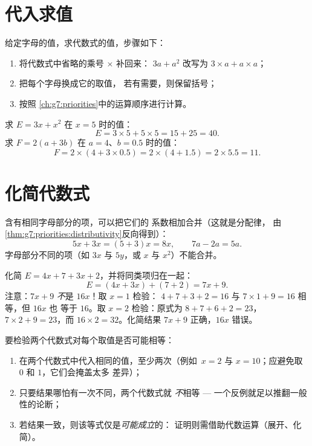 \section{代入求值}

\begin{method}[代数式求值]\label{met:g7:literal:substitute}
给定字母的值，求代数式的值，步骤如下：
\begin{enumerate}
  \item 将代数式中省略的乘号 $\times$ 补回来：
        $3a + a^2$ 改写为 $3 \times a + a \times a$；
  \item 把每个字母换成它的取值，
        若有需要，则保留括号；
  \item 按照
        \cref{ch:g7:priorities}中的运算顺序进行计算。
\end{enumerate}
\end{method}

\begin{example}\label{ex:g7:literal:substitute}
求 $E = 3x + x^2$ 在 $x = 5$ 时的值：
\[
E = 3 \times 5 + 5 \times 5 = 15 + 25 = 40 .
\]
求 $F = 2(a + 3b)$ 在 $a = 4$、$b = 0.5$ 时的值：
\[
F = 2 \times (4 + 3 \times 0.5) = 2 \times (4 + 1.5) = 2 \times 5.5
= 11 .
\]
\end{example}

\section{化简代数式}

\begin{proposition}[合并同类项]\label{prop:g7:literal:reduce}
含有相同字母部分的项，可以把它们的
系数相加合并（这就是分配律，
由\cref{thm:g7:priorities:distributivity}反向得到）：
\[
5x + 3x = (5 + 3)x = 8x,
\qquad
7a - 2a = 5a .
\]
字母部分不同的项（如 $3x$ 与 $5y$，或 $x$ 与
$x^2$）不能合并。
\end{proposition}

\begin{example}\label{ex:g7:literal:reduce}
化简 $E = 4x + 7 + 3x + 2$，并将同类项归在一起：
\[
E = (4x + 3x) + (7 + 2) = 7x + 9 .
\]
注意：$7x + 9$ \emph{不}是 $16x$！取 $x = 1$ 检验：
$4 + 7 + 3 + 2 = 16$ 与 $7 \times 1 + 9 = 16$ 相等，但 $16x$ 也
等于 $16$。取 $x = 2$ 检验：原式为
$8 + 7 + 6 + 2 = 23$，$7 \times 2 + 9 = 23$，而
$16 \times 2 = 32$。化简结果 $7x + 9$ 正确，$16x$ 错误。
\end{example}

\begin{method}[检验等式]\label{met:g7:literal:test}
要检验两个代数式对每个取值是否可能相等：
\begin{enumerate}
  \item 在两个代数式中代入相同的值，至少两次（例如\
        $x = 2$ 与 $x = 10$；应避免取 $0$ 和 $1$，它们会掩盖太多
        差异）；
  \item 只要结果哪怕有一次不同，两个代数式就
        \emph{不}相等 --- 一个反例就足以推翻一般性的论断；
  \item 若结果一致，则该等式仅是\emph{可能成立}的：
        证明则需借助代数运算（展开、化简）。
\end{enumerate}
\end{method}

